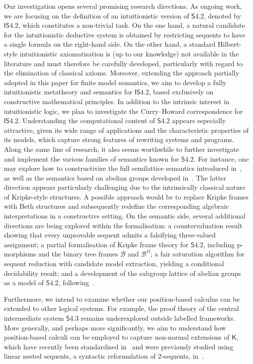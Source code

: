 \documentclass{article}
\newcommand{\logic}{\mathsf{S4.2}}
\newcommand{\axname}[1]{\mathsf{#1}}
\theoremstyle{definition}
\begin{document}
Our investigation opens several promising research directions. As ongoing work, we are focusing on the definition of an intuitionistic version of $\logic$, denoted by $\mathsf{I}\logic$, which constitutes a non-trivial task. On the one hand, a natural candidate for the intuitionistic deductive system is obtained by restricting sequents to have a single formula on the right-hand side. On the other hand, a standard Hilbert-style intuitionistic axiomatisation is (up to our knowledge) not available in the literature and must therefore be carefully developed, particularly with regard to the elimination of classical axioms.
Moreover, extending the approach partially adopted in this paper for finite model semantics, we aim to develop a fully intuitionistic metatheory and semantics for $\mathsf{I}\logic$, based exclusively on constructive mathematical principles.
In addition to the intrinsic interest in intuitionistic logic, we plan to investigate the Curry–Howard correspondence for $\mathsf{I}\logic$. Understanding the computational content of $\logic$ appears especially attractive, given its wide range of applications and the characteristic properties of its models, which capture strong features of rewriting systems and programs.
Along the same line of research, it also seems worthwhile to further investigate and implement the various families of semantics known for $\logic$. For instance, one may explore how to constructivize the full semilattice semantics introduced in~\cite{Martini2024:S42NaturalDeduction}, as well as the semantics based on abelian groups developed in~\cite{Berger2023:ModalAbelian}. The latter direction appears particularly challenging due to the intrinsically classical nature of Kripke-style structures. A possible approach would be to replace Kripke frames with Beth structures and subsequently redefine the corresponding algebraic interpretations in a constructive setting.
On the semantic side, several additional directions are being explored within the formalisation: a countervaluation result showing that every unprovable sequent admits a falsifying three-valued assignment; a partial formalisation of Kripke frame theory for $\logic$, including p-morphisms and the binary tree frames $\mathcal{B}$ and $\mathcal{B}^\Omega$; a fair saturation algorithm for sequent reduction with candidate model extraction, yielding a conditional decidability result; and a development of the subgroup lattice of abelian groups as a model of $\logic$, following~\cite{Berger2023:ModalAbelian}.

Furthermore, we intend to examine whether our position-based calculus can be extended to other logical systems. For example, the proof theory of the central intermediate system $\axname{S4.3}$ remains underexplored outside labelled frameworks. More generally, and perhaps more significantly, we aim to understand how position-based calculi can be employed to capture non-normal extensions of $\axname{K}$, which have recently been standardised in~\cite{Dalmonte2025:MinimalModal} and were previously studied using linear nested sequents, a syntactic reformulation of 2-sequents, in~\cite{Pimentel2019}.
\end{document}
